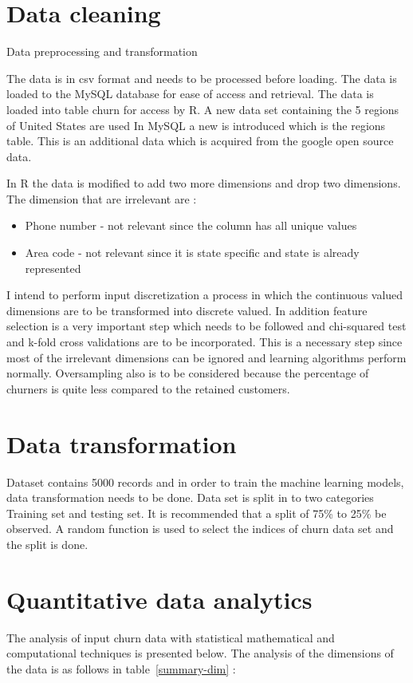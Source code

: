 \section{Data cleaning}

Data preprocessing and transformation

The data is in csv format and needs to be processed before loading. The data is loaded to the MySQL database for ease of access and retrieval. The data is loaded into table churn for access by R.
A new data set containing the 5 regions of United States are used   In MySQL a new is introduced which is the regions table. This is an additional data which is acquired from the google open source data. 

In R the data is modified to add two more dimensions and drop two dimensions. 
The dimension that are irrelevant are :
\begin{itemize}
	\item Phone number - not relevant since the column has all unique values
	\item Area code - not relevant since it is state specific and state is already represented
\end{itemize}

I intend to perform input discretization a process in which the continuous valued dimensions are to be transformed into discrete valued. 
In addition feature selection is a very important step which needs to be followed and chi-squared test and k-fold cross validations are to be incorporated. This is a necessary step since most of the irrelevant dimensions can be ignored and learning algorithms perform normally.
Oversampling also is to be considered because the percentage of churners is quite less compared to the retained customers.

\section{Data transformation}
Dataset contains 5000 records and in order to train the machine learning models, data transformation needs to be done.
Data set is split in to two categories Training set and testing set. It is recommended that a split of 75\% to 25\% be observed.
A random function is used to select the indices of churn data set and the split is done.


\section{Quantitative data analytics}
The analysis of input churn data with statistical mathematical and computational techniques is presented below.
The analysis of the dimensions of the data is as follows in table~\ref{summary-dim} :

